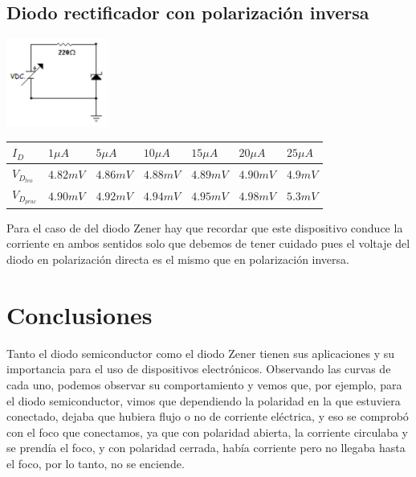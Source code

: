 \documentclass{mylib/reporteConCalif}
\begin{document}
\subsection*{Diodo rectificador con polarización inversa}
\begin{center}
	\includegraphics[scale=1]{img/labdisp_pract3/diodoz_i}


	\begin{tabu} to 0.8\textwidth { | X[c] | X[c] | X[c] | X[c] | X[c] | X[c] | X[c] |  }
	 \hline
	 $I_{D}$ & $1 \mu A$ & $5 \mu A$ & $10 \mu A$ & $15 \mu A$ & $20 \mu A$ & $25 \mu A$ \\
	 \hline
	 $V_{D_{teo}}$ & $4.82 mV$ & $4.86 mV$ & $4.88 mV$ & $4.89 mV$ & $4.90 mV$ & $4.9 mV$ \\
	\hline
	$V_{D_{prac}}$ & $4.90 mV$ & $4.92 mV$ & $4.94 mV$ & $4.95 mV$ & $4.98 mV$ & $5.3 mV$ \\
	\hline
	\end{tabu}

\end{center}

Para el caso de del diodo Zener hay que recordar que este dispositivo conduce la corriente en ambos sentidos solo que debemos de tener cuidado pues el voltaje del diodo en polarización directa es el mismo que en polarización inversa.


\section*{Conclusiones}

Tanto el diodo semiconductor como el diodo Zener tienen sus aplicaciones y su importancia para el uso de dispositivos electrónicos. Observando las curvas de cada uno, podemos observar su comportamiento y vemos que, por ejemplo, para el diodo semiconductor, vimos que dependiendo la polaridad en la que estuviera conectado, dejaba que hubiera flujo o no de corriente eléctrica, y eso se comprobó con el foco que conectamos, ya que con polaridad abierta, la corriente circulaba y se prendía el foco, y con polaridad cerrada, había corriente pero no llegaba hasta el foco, por lo tanto, no se enciende.
\end{document}
